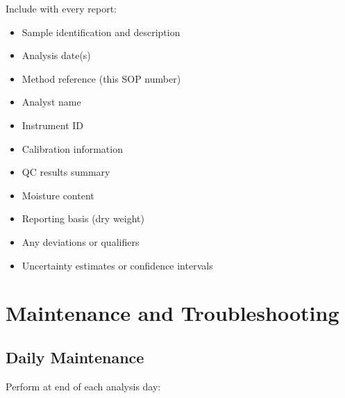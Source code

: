\documentclass[11pt,a4paper]{article}\usepackage[]{graphicx}\usepackage[]{xcolor}
\begin{document}
Include with every report:
\begin{itemize}[noitemsep]
    \item Sample identification and description
    \item Analysis date(s)
    \item Method reference (this SOP number)
    \item Analyst name
    \item Instrument ID
    \item Calibration information
    \item QC results summary
    \item Moisture content
    \item Reporting basis (dry weight)
    \item Any deviations or qualifiers
    \item Uncertainty estimates or confidence intervals
\end{itemize}

\section{Maintenance and Troubleshooting}

\subsection{Daily Maintenance}

Perform at end of each analysis day:
\end{document}
